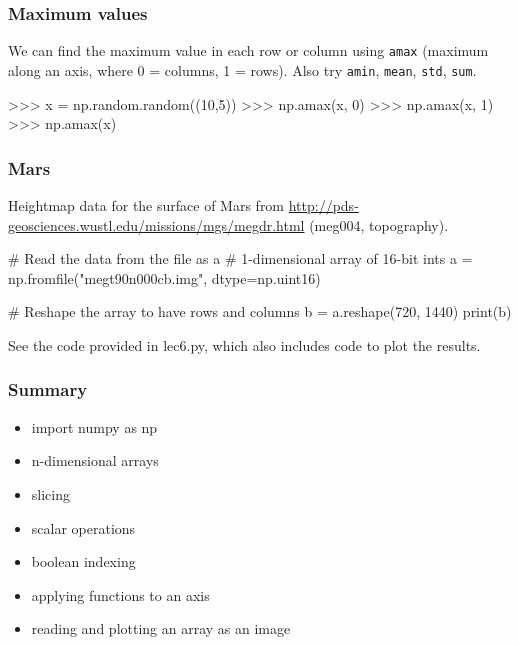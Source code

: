\documentclass{beamer}
\begin{document}
\begin{frame}[fragile]
\frametitle{Maximum values}
We can find the maximum value in each row or column using \texttt{amax}
(maximum along an axis, where 0 = columns, 1 = rows). Also
try \texttt{amin}, \texttt{mean}, \texttt{std}, \texttt{sum}.
\begin{code}
>>> x = np.random.random((10,5))
>>> np.amax(x, 0)
>>> np.amax(x, 1)
>>> np.amax(x)
\end{code}
\end{frame}

\begin{frame}[fragile]
\frametitle{Mars}
Heightmap data for the surface of Mars from
\url{http://pds-geosciences.wustl.edu/missions/mgs/megdr.html} (meg004,
topography).
\pause
\begin{code}
# Read the data from the file as a 
# 1-dimensional array of 16-bit ints
a = np.fromfile("megt90n000cb.img", dtype=np.uint16)

# Reshape the array to have rows and columns
b = a.reshape(720, 1440)
print(b)
\end{code}
See the code provided in lec6.py, which also includes code to plot the results.
\end{frame}

\begin{frame}[fragile]
\frametitle{Summary}
\begin{itemize}
\item import numpy as np
\item n-dimensional arrays
\item slicing
\item scalar operations
\item boolean indexing
\item applying functions to an axis 
\item reading and plotting an array as an image
\end{itemize}
\end{frame}
\end{document}
